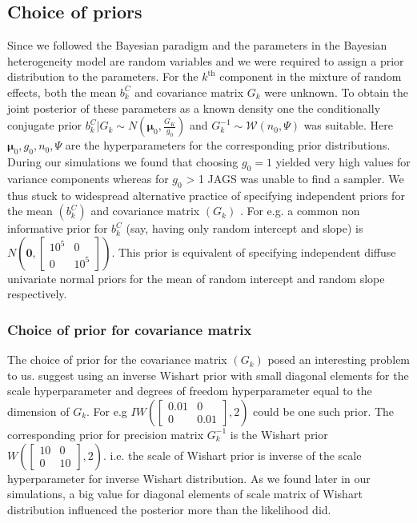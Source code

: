 \subsection{Choice of priors}
\label{subsec : choice_priors}
Since we followed the Bayesian paradigm and the parameters in the Bayesian heterogeneity model are random variables and we were required to assign a prior distribution to the parameters. For the $k^\text{th}$ component in the mixture of random effects, both the mean $b_k^C$ and covariance matrix $G_k$ were unknown. To obtain the joint posterior of these parameters as a known density one the conditionally conjugate prior $b_k^C | G_k \sim N(\boldsymbol{\mu}_0, \frac {G_K} {g_0})$ and $G_k^{-1} \sim \mathcal{W} (n_0, \Psi)$ was suitable. Here $\boldsymbol{\mu}_0, g_0, n_0, \Psi$ are the hyperparameters for the corresponding prior distributions. During our simulations we found that choosing $g_0=1$ yielded very high values for variance components whereas for $g_0$ > 1 JAGS was unable to find a sampler. We thus stuck to widespread alternative practice of specifying independent priors for the mean $(b_k^C)$ and covariance matrix $(G_k)$ \citep[chap. 17]{gelman_data_2006}. For e.g. a common non informative prior for $b_k^C$ (say, having only random intercept and slope) is $N(\boldsymbol{0}, \begin{bmatrix}10^5 & 0 \\ 0 & 10^5\end{bmatrix})$. This prior is equivalent of specifying independent diffuse univariate normal priors for the mean of random intercept and random slope respectively.

\subsubsection{Choice of prior for covariance matrix}
The choice of prior for the covariance matrix $(G_k)$ posed an interesting problem to us. \citet[pg. 260]{lesaffre_bayesian_2012} suggest using an inverse Wishart prior with small diagonal elements for the scale hyperparameter and degrees of freedom hyperparameter equal to the dimension of $G_k$. For e.g $IW(\begin{bmatrix}0.01 & 0 \\ 0 & 0.01\end{bmatrix}, 2)$ could be one such prior. The corresponding prior for precision matrix $G_k^{-1}$ is the Wishart prior $W(\begin{bmatrix}10 & 0 \\ 0 & 10\end{bmatrix}, 2)$. i.e. the scale of Wishart prior is inverse of the scale hyperparameter for inverse Wishart distribution. As we found later in our simulations, a big value for diagonal elements of scale matrix of Wishart distribution influenced the posterior more than the likelihood did.\\

